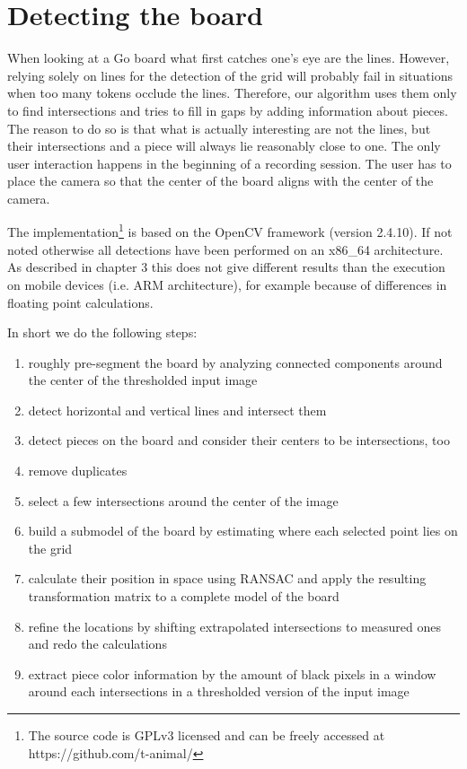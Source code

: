 
\chapter{Detecting the board}
	\label{detector}
	When looking at a Go board what first catches one's eye are the lines. However, relying solely on lines for the detection of the grid will probably fail in situations when too many tokens occlude the lines. Therefore, our algorithm uses them only to find intersections and tries to fill in gaps by adding information about pieces. The reason to do so is that what is actually interesting are not the lines, but their intersections and a piece will always lie reasonably close to one. The only user interaction happens in the beginning of a recording session. The user has to place the camera so that the center of the board aligns with the center of the camera.

	The implementation\footnote{The source code is GPLv3 licensed and can be freely accessed at https://github.com/t-animal/} is based on the OpenCV framework (version 2.4.10). If not noted otherwise all detections have been performed on an x86\_64 architecture. As described in chapter 3 this does not give different results than the execution on mobile devices (i.e. ARM architecture), for example because of differences in floating point calculations.

	In short we do the following steps:
	\begin{enumerate}
		\item roughly pre-segment the board by analyzing connected components around the center of the thresholded input image
		\item detect horizontal and vertical lines and intersect them
		\item detect pieces on the board and consider their centers to be intersections, too
		\item remove duplicates
		\item select a few intersections around the center of the image
		\item build a submodel of the board by estimating where each selected point lies on the grid
		\item calculate their position in space using RANSAC and apply the resulting transformation matrix to a complete model of the board
		\item refine the locations by shifting extrapolated intersections to measured ones and redo the calculations
		\item extract piece color information by the amount of black pixels in a window around each intersections in a thresholded version of the input image
	\end{enumerate}

